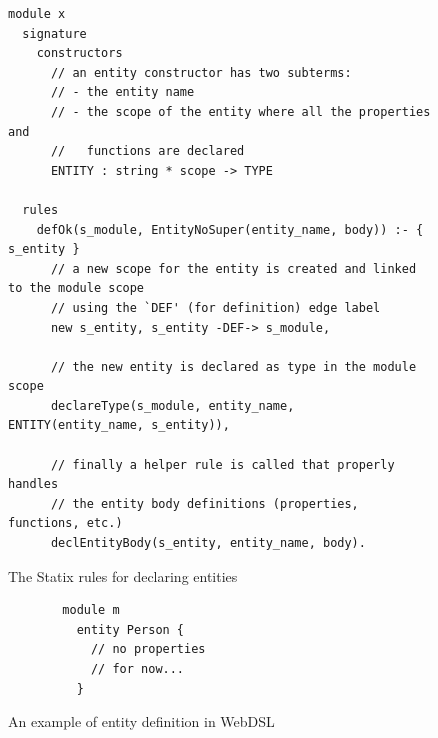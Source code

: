       \begin{figure}
        \begin{verbatim}
module x
  signature
    constructors
      // an entity constructor has two subterms:
      // - the entity name
      // - the scope of the entity where all the properties and 
      //   functions are declared
      ENTITY : string * scope -> TYPE

  rules
    defOk(s_module, EntityNoSuper(entity_name, body)) :- { s_entity }
      // a new scope for the entity is created and linked to the module scope
      // using the `DEF' (for definition) edge label
      new s_entity, s_entity -DEF-> s_module,

      // the new entity is declared as type in the module scope
      declareType(s_module, entity_name, ENTITY(entity_name, s_entity)),

      // finally a helper rule is called that properly handles
      // the entity body definitions (properties, functions, etc.)
      declEntityBody(s_entity, entity_name, body).
        \end{verbatim}
        \caption{\label{fig:webdsl-entity-declaration-statix}The Statix rules for declaring entities}
      \end{figure}

      \begin{figure}
        \begin{subfigure}[b]{0.2\textwidth}
          \begin{verbatim}
  module m
    entity Person { 
      // no properties
      // for now...
    }
          \end{verbatim}
          \caption{\label{fig:webdsl-entity-example-webdsl}}
        \end{subfigure}
        \begin{subfigure}[b]{0.8\textwidth}
          \centering
          \caption{\label{fig:webdsl-entity-example-sg}}
        \end{subfigure}
        \caption{\label{fig:webdsl-entity-example}An example of entity definition in WebDSL}
      \end{figure}

